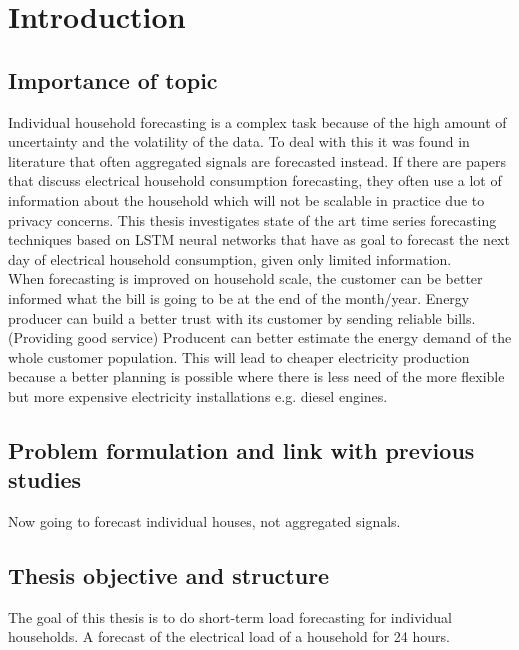 \chapter{Introduction}
\label{cha:intro}









\section{Importance of topic}
Individual household forecasting is a complex task because of the high amount of uncertainty
and the volatility of the data. To deal with this it was found in literature that often aggregated signals are forecasted instead. If there are papers that discuss electrical household consumption forecasting, they often use a lot of information about the household which will not be scalable in practice due to privacy concerns. This thesis investigates state of the art time series forecasting techniques based on LSTM neural networks that have as goal to forecast the next day of electrical household consumption, given only limited information.\\

When forecasting is improved on household scale, the customer can be better informed what the bill is going to be at the end of the month/year.
Energy producer can build a better trust with its customer by sending reliable bills. (Providing good service)
Producent can better estimate the energy demand of the whole customer population. This will lead to cheaper electricity production because a better planning is possible where there is less need of the more 
flexible but more expensive electricity installations e.g. diesel engines.

\section{Problem formulation and link with previous studies}
Now going to forecast individual houses, not aggregated signals. 


\section{Thesis objective and structure}
The goal of this thesis is to do short-term load forecasting for individual households. A forecast of the electrical load of a household for 24 hours. 


